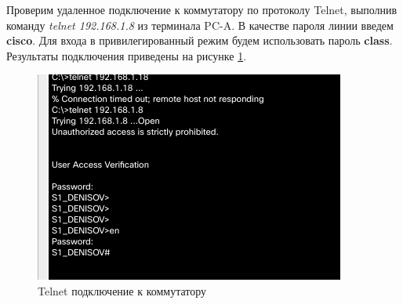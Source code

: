 \documentclass[a4paper,14pt]{extarticle}
\begin{document}
{
	Проверим удаленное подключение к коммутатору по протоколу Telnet, выполнив команду \textit{telnet 192.168.1.8} из терминала PC-A. В качестве пароля линии введем \textbf{cisco}. Для входа в привилегированный режим будем использовать пароль \textbf{class}. Результаты подключения приведены на рисунке \ref{fig:pc-to-swith}.
\begin{figure}[h!]
	\centering
	\includegraphics[width=0.6\linewidth]{images/pc-to-swith}
	\caption{Telnet подключение к коммутатору}
	\label{fig:pc-to-swith}
\end{figure}
}
\end{document}
